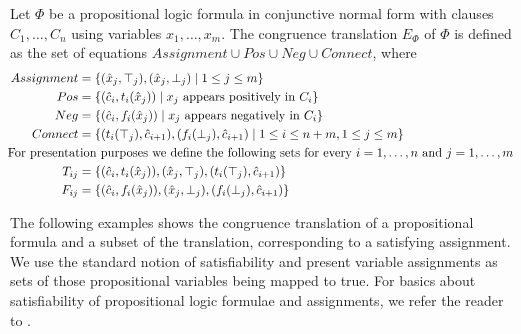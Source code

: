\begin{definition}

Let $\Phi$ be a propositional logic formula in conjunctive normal form with clauses $C_1,\ldots,C_n$ using variables $x_1,\ldots,x_m$.
The congruence translation $E_{\Phi}$ of $\Phi$ is defined as the set of equations $Assignment \cup Pos \cup Neg \cup Connect$, where
\begin{align*}
	Assignment &= \{ (\hat{x}_j,\top_j), (\hat{x}_j,\bot_j) \mid 1 \leq j \leq m\} \\
	Pos &= \{ (\hat{c}_i, t_i(\hat{x}_j)) \mid x_j \text{ appears positively in } C_i\} \\
	Neg &= \{ (\hat{c}_i, f_i(\hat{x}_j)) \mid x_j \text{ appears negatively in } C_i\} \\
	Connect &= \{ (t_i(\top_j),\hat{c}_{i+1}),(f_i(\bot_j), \hat{c}_{i+1}) \mid 1 \leq i \leq n+m, 1 \leq j \leq m\} \\
&\hspace{-2cm}\text{For presentation purposes we define the following sets for every $i = 1,\ldots, n$ and $j = 1,\ldots, m$}\\
T_{ij} &= \{(\hat{c}_i, t_i(\hat{x}_j)), (\hat{x}_j,\top_j), (t_i(\top_j),\hat{c}_{i+1})\} \\
F_{ij} &= \{(\hat{c}_i, f_i(\hat{x}_j)), (\hat{x}_j,\bot_j), (f_i(\bot_j),\hat{c}_{i+1})\}
\end{align*}

\end{definition}

The following examples shows the congruence translation of a propositional formula and a subset of the translation, corresponding to a satisfying assignment.
We use the standard notion of satisfiability and present variable assignments as sets of those propositional variables being mapped to true.
For basics about satisfiability of propositional logic formulae and assignments, we refer the reader to \cite{Biere2009}.

